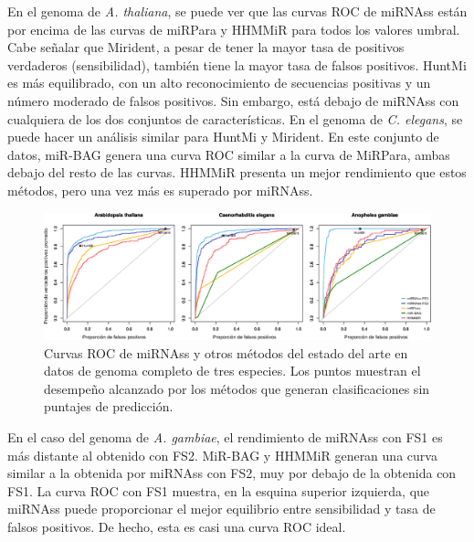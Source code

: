 En el genoma de \textit{A. thaliana}, se puede ver que las curvas ROC de miRNAss están por encima de las curvas de miRPara y HHMMiR para todos los valores
umbral. Cabe señalar que Mirident, a pesar de tener la mayor tasa de positivos verdaderos (sensibilidad), también tiene la mayor tasa de falsos positivos.
HuntMi es más equilibrado, con un alto reconocimiento de secuencias positivas y un número moderado de falsos positivos. Sin embargo, está debajo de miRNAss
con cualquiera de los dos conjuntos de características.
En el genoma de \textit{C. elegans}, se puede hacer un análisis similar para HuntMi y Mirident. En este conjunto de datos, miR-BAG genera una curva ROC
similar a la curva de MiRPara, ambas debajo del resto de las curvas. HHMMiR presenta un mejor rendimiento que estos métodos, pero una vez más es superado por
miRNAss.
\begin{figure}[tpb]
	\centering
	\includegraphics[width=\linewidth]{fig/genome-wide_ROC.eps}
	\caption[Curvas ROC en genoma completo]{Curvas ROC de miRNAss y otros métodos del estado del arte en datos de genoma completo de tres especies. Los puntos muestran el desempeño
		alcanzado por los métodos que generan clasificaciones sin puntajes de predicción.}
	\label{fig:ROC}
\end{figure}
En el caso del genoma de \textit{A. gambiae}, el rendimiento de miRNAss con FS1 es más distante al obtenido con FS2. MiR-BAG y HHMMiR generan una curva
similar a la obtenida por miRNAss con FS2, muy por debajo de la obtenida con FS1. La curva ROC con FS1 muestra, en la esquina superior izquierda, que miRNAss
puede proporcionar el mejor equilibrio entre sensibilidad y tasa de falsos positivos. De hecho, esta es casi una curva ROC ideal.


